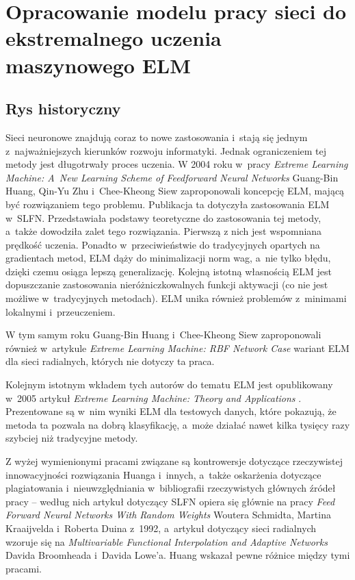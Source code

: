 \documentclass[pl]{minipw} %
\begin{document}
\chapter{Opracowanie modelu pracy sieci do ekstremalnego uczenia maszynowego ELM}
\section{Rys historyczny}
Sieci neuronowe znajdują coraz to nowe zastosowania i~stają się jednym z~najważniejszych kierunków rozwoju informatyki. Jednak ograniczeniem tej metody jest długotrwały proces uczenia.
\label{rys}
W 2004 roku w~pracy \textit{Extreme Learning Machine: A~New Learning Scheme of Feedforward Neural Networks} \cite{huang-elm-base} Guang-Bin Huang, Qin-Yu Zhu i~Chee-Kheong Siew zaproponowali koncepcję ELM, mającą być rozwiązaniem tego problemu. Publikacja ta dotyczyła zastosowania ELM w~SLFN. Przedstawiała podstawy teoretyczne do zastosowania tej metody, a~także dowodziła zalet tego rozwiązania. Pierwszą z nich jest wspomniana prędkość uczenia. Ponadto w~przeciwieństwie do tradycyjnych opartych na gradientach metod, ELM dąży do minimalizacji norm wag, a~nie tylko błędu, dzięki czemu osiąga lepszą generalizację. Kolejną istotną własnością ELM jest dopuszczanie zastosowania nieróżniczkowalnych funkcji aktywacji (co nie jest możliwe w~tradycyjnych metodach). ELM unika również problemów z~minimami lokalnymi i~przeuczeniem. 

W tym samym roku Guang-Bin Huang i~Chee-Kheong Siew zaproponowali również w~artykule \textit{Extreme Learning Machine: RBF Network Case} \cite{huang-elm-rbf} wariant ELM dla sieci radialnych, których nie dotyczy ta praca. 

Kolejnym istotnym wkładem tych autorów do tematu ELM jest opublikowany w~2005 artykuł \textit{Extreme Learning Machine: Theory and Applications} \cite{huang-elm-tap}. Prezentowane są w~nim wyniki ELM dla testowych danych, które pokazują, że metoda ta pozwala na dobrą klasyfikację, a~może działać nawet kilka tysięcy razy szybciej niż tradycyjne metody.

Z wyżej wymienionymi pracami związane są kontrowersje dotyczące rzeczywistej innowacyjności rozwiązania Huanga i~innych, a~także oskarżenia dotyczące plagiatowania i~nieuwzględniania w~bibliografii rzeczywistych głównych źródeł pracy \cite{originofelm} -- według nich artykuł dotyczący SLFN opiera się głównie na pracy \textit{Feed Forward Neural Networks With Random Weights} Woutera Schmidta, Martina Kraaijvelda i~Roberta Duina z~1992, a~artykuł dotyczący sieci radialnych wzoruje się na \textit{Multivariable Functional Interpolation and Adaptive Networks} Davida Broomheada i~Davida Lowe'a. Huang wskazał pewne różnice między tymi pracami.
\end{document}
